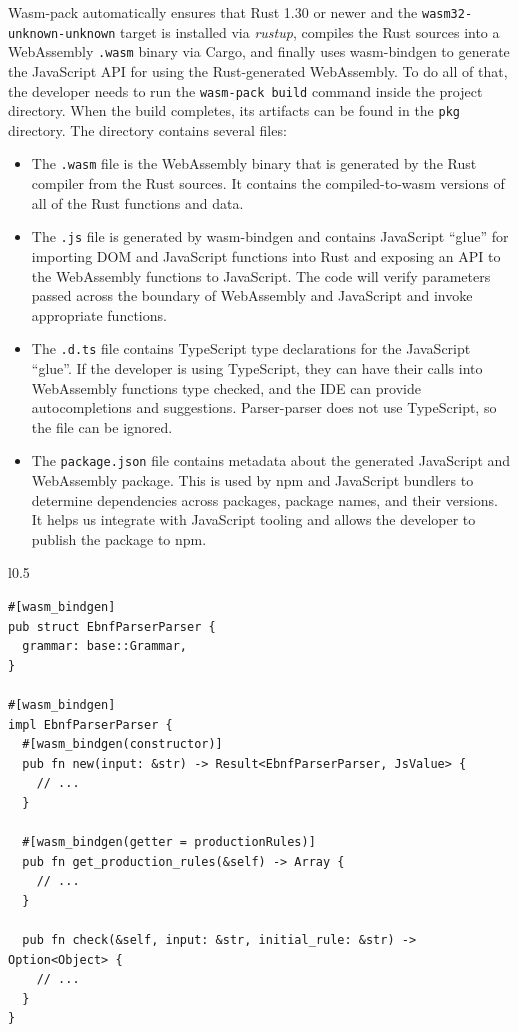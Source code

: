 \documentclass[english,engineering]{wizthesis}
\newcommand{\thisproject}{Parser-parser}
\begin{document}
Wasm-pack automatically ensures that Rust 1.30 or newer and the
\texttt{wasm32-unknown-unknown} target is installed via \emph{rustup}, compiles
the Rust sources into a WebAssembly \texttt{.wasm} binary via Cargo, and finally
uses wasm-bindgen to generate the JavaScript API for using the Rust-generated
WebAssembly. To do all of that, the developer needs to run the \texttt{wasm-pack
build} command inside the project directory. When the build completes, its
artifacts can be found in the \texttt{pkg} directory. The directory contains
several files:
\begin{itemize}
  \item The \texttt{.wasm} file is the WebAssembly binary that is generated by
  the Rust compiler from the Rust sources. It contains the compiled-to-wasm
  versions of all of the Rust functions and data.
  \item The \texttt{.js} file is generated by wasm-bindgen and contains
  JavaScript ``glue'' for importing DOM and JavaScript functions into Rust and
  exposing an API to the WebAssembly functions to JavaScript. The code will
  verify parameters passed across the boundary of WebAssembly and JavaScript and
  invoke appropriate functions.
  \item The \texttt{.d.ts} file contains TypeScript type declarations for the
  JavaScript ``glue''. If the developer is using TypeScript, they can have their
  calls into WebAssembly functions type checked, and the IDE can provide
  autocompletions and suggestions. \thisproject{} does not use TypeScript, so
  the file can be ignored.
  \item The \texttt{package.json} file contains metadata about the generated
  JavaScript and WebAssembly package. This is used by npm and JavaScript
  bundlers to determine dependencies across packages, package names, and their
  versions. It helps us integrate with JavaScript tooling and allows the
  developer to publish the package to npm.
\end{itemize}

\begin{wraplisting}{l}{0.5\textwidth}
  \begin{verbatim}
#[wasm_bindgen]
pub struct EbnfParserParser {
  grammar: base::Grammar,
}

#[wasm_bindgen]
impl EbnfParserParser {
  #[wasm_bindgen(constructor)]
  pub fn new(input: &str) -> Result<EbnfParserParser, JsValue> {
    // ...
  }

  #[wasm_bindgen(getter = productionRules)]
  pub fn get_production_rules(&self) -> Array {
    // ...
  }

  pub fn check(&self, input: &str, initial_rule: &str) -> Option<Object> {
    // ...
  }
}
  \end{verbatim}
  \caption{The definition of the EBNF parser struct that encapsulates the
  grammar.}
  \label{lst:wasm-glue-parser}
\end{wraplisting}
\end{document}
